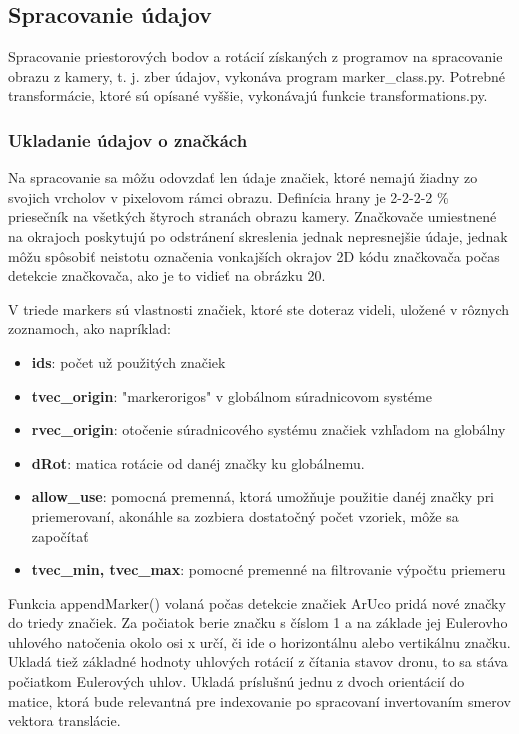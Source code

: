 \subsection{Spracovanie údajov}
Spracovanie priestorových bodov a rotácií získaných z programov na spracovanie obrazu z kamery, t. j. zber údajov, vykonáva program marker\_class.py. Potrebné transformácie, ktoré sú opísané vyššie, vykonávajú funkcie transformations.py.
\subsubsection{Ukladanie údajov o značkách}
Na spracovanie sa môžu odovzdať len údaje značiek, ktoré nemajú žiadny zo svojich vrcholov v pixelovom rámci obrazu. Definícia hrany je 2-2-2-2 \% priesečník na všetkých štyroch stranách obrazu kamery. Značkovače umiestnené na okrajoch poskytujú po odstránení skreslenia jednak nepresnejšie údaje, jednak môžu spôsobiť neistotu označenia vonkajších okrajov 2D kódu značkovača počas detekcie značkovača, ako je to vidieť na obrázku 20.

V triede markers sú vlastnosti značiek, ktoré ste doteraz videli, uložené v rôznych zoznamoch, ako napríklad:
\begin{itemize}
    \item \textbf{ids}: počet už použitých značiek
    \item \textbf{tvec\_origin}: "markerorigos" v globálnom súradnicovom systéme
    \item \textbf{rvec\_origin}: otočenie súradnicového systému značiek vzhľadom na globálny
    \item \textbf{dRot}: matica rotácie od danéj značky ku globálnemu.
    \item \textbf{allow\_use}: pomocná premenná, ktorá umožňuje použitie danéj značky pri priemerovaní, akonáhle sa zozbiera dostatočný počet vzoriek, môže sa započítať
    \item \textbf{tvec\_min, tvec\_max}: pomocné premenné na filtrovanie výpočtu priemeru
\end{itemize}

Funkcia appendMarker() volaná počas detekcie značiek ArUco pridá nové značky do triedy značiek. Za počiatok berie značku s číslom 1 a na základe jej Eulerovho uhlového natočenia okolo osi x určí, či ide o horizontálnu alebo vertikálnu značku. Ukladá tiež základné hodnoty uhlových rotácií z čítania stavov dronu, to sa stáva počiatkom Eulerových uhlov. Ukladá príslušnú jednu z dvoch orientácií do matice, ktorá bude relevantná pre indexovanie po spracovaní invertovaním smerov vektora translácie.

